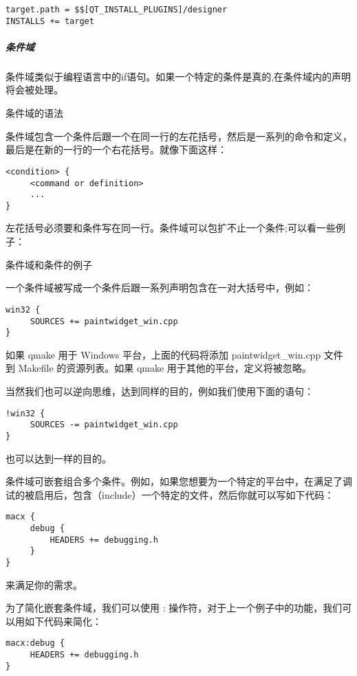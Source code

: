 \begin{verbatim}
target.path = $$[QT_INSTALL_PLUGINS]/designer
INSTALLS += target
\end{verbatim}

\subparagraph{条件域}\label{ux6761ux4ef6ux57df}

条件域类似于编程语言中的if语句。如果一个特定的条件是真的,在条件域内的声明将会被处理。

条件域的语法

条件域包含一个条件后跟一个在同一行的左花括号，然后是一系列的命令和定义，最后是在新的一行的一个右花括号。就像下面这样：

\begin{verbatim}
<condition> {
     <command or definition>
     ...
}
\end{verbatim}

左花括号必须要和条件写在同一行。条件域可以包扩不止一个条件;可以看一些例子：

条件域和条件的例子

一个条件域被写成一个条件后跟一系列声明包含在一对大括号中，例如：

\begin{verbatim}
win32 {
     SOURCES += paintwidget_win.cpp
}
\end{verbatim}

如果 qmake 用于 Windows 平台，上面的代码将添加 paintwidget\_win.cpp
文件到 Makefile 的资源列表。如果 qmake 用于其他的平台，定义将被忽略。

当然我们也可以逆向思维，达到同样的目的，例如我们使用下面的语句：

\begin{verbatim}
!win32 {
     SOURCES -= paintwidget_win.cpp
}
\end{verbatim}

也可以达到一样的目的。

条件域可嵌套组合多个条件。例如，如果您想要为一个特定的平台中，在满足了调试的被启用后，包含（include）一个特定的文件，然后你就可以写如下代码：

\begin{verbatim}
macx {
     debug {
         HEADERS += debugging.h
     }
}
\end{verbatim}

来满足你的需求。

为了简化嵌套条件域，我们可以使用 :
操作符，对于上一个例子中的功能，我们可以用如下代码来简化：

\begin{verbatim}
macx:debug {
     HEADERS += debugging.h
}
\end{verbatim}

